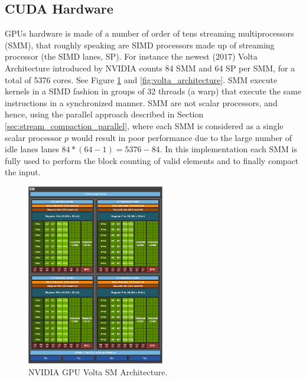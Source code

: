 \subsection{CUDA Hardware}
GPUs hardware is made of a number of order of tens streaming multiprocessors (SMM), that roughly speaking are SIMD processors made up of streaming processor (the SIMD lanes, SP). For instance the newest (2017) Volta Architecture introduced by NVIDIA counts 84 SMM and 64 SP per SMM, for a total of 5376 cores. See Figure \ref{fig:volta_sm} and \ref{fig:volta_architecture}.
SMM execute kernels in a SIMD fashion in groups of 32 threads (a warp) that execute the same instructions in a synchronized manner. SMM are not scalar processors, and hence, using the parallel approach described in Section \ref{sec:stream_compaction_parallel}, where each SMM is considered as a single scalar processor \(p\) would result in poor performance due to the large number of idle lanes lanes \( 84*(64-1)=5376-84\).
In this implementation each SMM is fully used to perform the block counting of valid elements and to finally compact the input.
\begin{figure}
	\begin{center}
		\includegraphics[width=6cm]{./images/stream_compaction/volta_sm}
		\caption{NVIDIA GPU Volta SM Architecture.}
		\label{fig:volta_sm}
	\end{center}
\end{figure}

